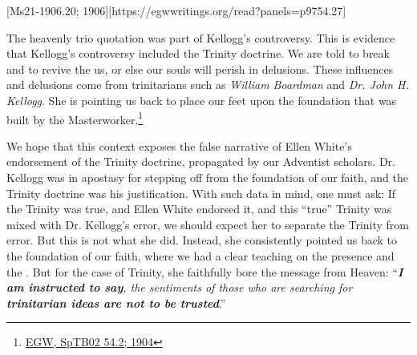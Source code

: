 [Ms21-1906.20; 1906][https://egwwritings.org/read?panels=p9754.27]

The heavenly trio quotation was part of Kellogg's controversy. This is evidence that Kellogg’s controversy included the Trinity doctrine. We are told to break  and to revive the  us, or else our souls will perish in delusions. These influences and delusions come from trinitarians such as \textit{William Boardman} and \textit{Dr. John H. Kellogg}. She is pointing us back to place our feet upon the foundation that was built by the Masterworker.\footnote{\href{https://egwwritings.org/?ref=en_SpTB02.54.2&para=417.276}{EGW, SpTB02 54.2; 1904}}

We hope that this context exposes the false narrative of Ellen White's endorsement of the Trinity doctrine, propagated by our Adventist scholars. Dr. Kellogg was in apostasy for stepping off from the foundation of our faith, and the Trinity doctrine was his justification. With such data in mind, one must ask: If the Trinity was true, and Ellen White endorsed it, and this “true” Trinity was mixed with Dr. Kellogg's error, we should expect her to separate the Trinity from error. But this is not what she did. Instead, she consistently pointed us back to the foundation of our faith, where we had a clear teaching on the presence and the . But for the case of Trinity, she faithfully bore the message from Heaven: “\textit{\textbf{I am instructed to say}, the sentiments of those who are searching for \textbf{trinitarian ideas are not to be trusted}}.”

